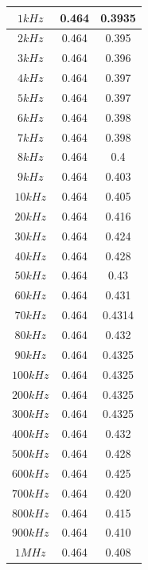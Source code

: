 \documentclass[letterpaper,10pt]{article}
\begin{document}
\begin{center}
\begin{tabular}{|c|c|c|}
    		\hline 
    		$1 kHz$  & 0.464 & 0.3935 \\
    		\hline 
    		$2 kHz$  & 0.464 & 0.395 \\
    		\hline 
    		$3 kHz$  & 0.464 & 0.396 \\
    		\hline 
    		$4 kHz$  & 0.464 & 0.397 \\
    		\hline 
    		$5 kHz$  & 0.464 & 0.397 \\
    		\hline 
    		$6 kHz$  & 0.464 & 0.398 \\
    		\hline
    		$7 kHz$  & 0.464 & 0.398 \\
    		\hline 
    		$8 kHz$  & 0.464 & 0.4 \\
    		\hline 
    		$9 kHz$  & 0.464 & 0.403 \\
    		\hline 
    		$10 kHz$  & 0.464 & 0.405 \\
    		\hline 
    		$20 kHz$  & 0.464 & 0.416 \\
    		\hline 
    		$30 kHz$  & 0.464 & 0.424 \\
    		\hline 
    		$40 kHz$  & 0.464 & 0.428 \\
    		\hline 
    		$50 kHz$  & 0.464 & 0.43 \\
    		\hline 
    		$60 kHz$  & 0.464 & 0.431 \\
    		\hline 
    		$70 kHz$  & 0.464 & 0.4314 \\
    		\hline 
    		$80 kHz$   & 0.464 & 0.432 \\
    		\hline 
    		$90 kHz$   & 0.464 & 0.4325 \\
    		\hline 
    		$100 kHz$  & 0.464 & 0.4325 \\
    		\hline 
    		$200 kHz$  & 0.464 & 0.4325 \\
    		\hline 
    		$300 kHz$  & 0.464 & 0.4325 \\ 
    		\hline 
    		$400 kHz$  & 0.464 & 0.432 \\
    		\hline 
    		$500 kHz$  & 0.464 & 0.428 \\
    		\hline 
    		$600 kHz$  & 0.464 & 0.425 \\
    		\hline 
    		$700 kHz$  & 0.464 & 0.420 \\
    		\hline 
    		$800 kHz$  & 0.464 & 0.415 \\
    		\hline 
    		$900 kHz$  & 0.464 & 0.410 \\
    		\hline 
    		$1 MHz$  & 0.464 & 0.408 \\
    		\hline
    	\end{tabular} 
    \end{center}
\end{document}
